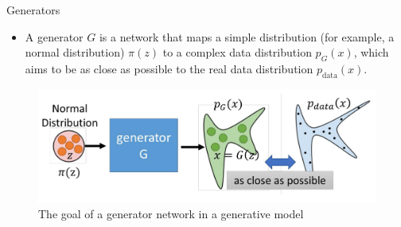 \begin{frame}{Generators}
    
\begin{itemize}
    \item A generator $G$ is a network that maps a simple distribution (for example, a normal distribution) $\pi(z)$ to a complex data distribution $p_G(x)$, which aims to be as close as possible to the real data distribution $p_{\text{data}}(x)$.
\end{itemize}
\begin{figure}
    \centering
    \includegraphics[height=0.5\textheight, width=\textwidth, keepaspectratio]{images/norm-flow/nfm_gen.png}
    \caption*{The goal of a generator network in a generative model}
\end{figure}
\end{frame}
